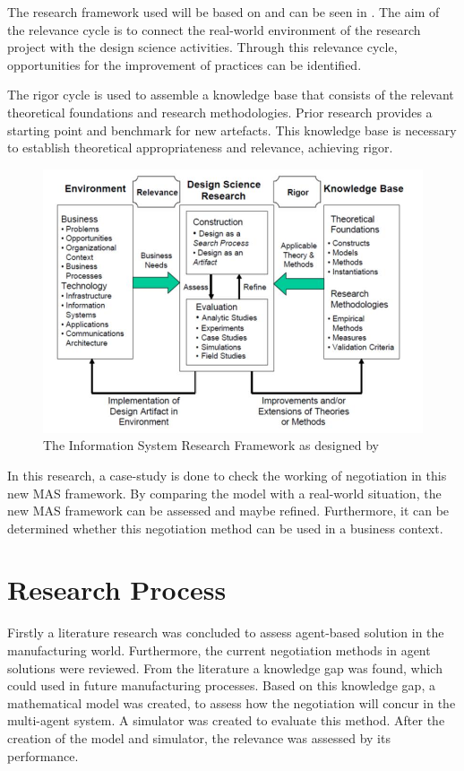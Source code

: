 The research framework used will be based on \citep{hevner2010design} and can be seen in . The aim of the relevance cycle is to connect the real-world environment of the research project with the design science activities. Through this relevance cycle, opportunities for the improvement of practices can be identified.

The rigor cycle is used to assemble a knowledge base that consists of the relevant theoretical foundations and research methodologies. Prior research provides a starting point and benchmark for new artefacts. This knowledge base is necessary to establish theoretical appropriateness and relevance, achieving rigor.

\begin{figure}[h]
	\centering
	\includegraphics[width=0.7\linewidth]{./img/InformationSystemResearchFramework.jpg}
	\caption{The Information System Research Framework as designed by \citet{hevner2010design}}
	\label{fig:InformationSystemResearchFramework}
\end{figure}

In this research, a case-study is done to check the working of negotiation in this new MAS framework. By comparing the model with a real-world situation, the new MAS framework can be assessed and maybe refined. Furthermore, it can be determined whether this negotiation method can be used in a business context.

\section{Research Process}
Firstly a literature research was concluded to assess agent-based solution in the manufacturing world. Furthermore, the current negotiation methods in agent solutions were reviewed. From the literature a knowledge gap was found, which could used in future manufacturing processes. Based on this knowledge gap, a mathematical model was created, to assess how the negotiation will concur in the multi-agent system. A simulator was created to evaluate this method. After the creation of the model and simulator, the relevance was assessed by its performance.

